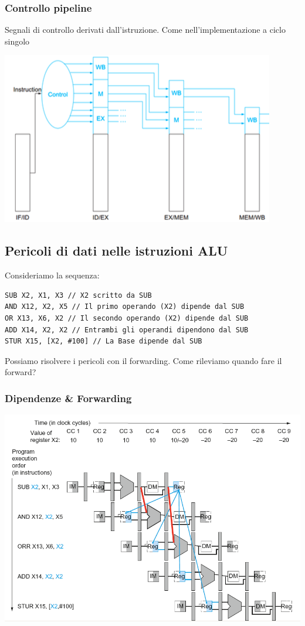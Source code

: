\documentclass[12pt,a4paper]{article}
\begin{document}
\subsubsection{Controllo pipeline}
Segnali di controllo derivati dall'istruzione. Come nell'implementazione a ciclo singolo
\begin{center}
\includegraphics[width=0.6\columnwidth]{img/pipeline_control_1.png}
\end{center}

\subsection{Pericoli di dati nelle istruzioni ALU}
Consideriamo la sequenza:
\begin{verbatim}
SUB X2, X1, X3 // X2 scritto da SUB
AND X12, X2, X5 // Il primo operando (X2) dipende dal SUB
OR X13, X6, X2 // Il secondo operando (X2) dipende dal SUB 
ADD X14, X2, X2 // Entrambi gli operandi dipendono dal SUB
STUR X15, [X2, #100] // La Base dipende dal SUB
\end{verbatim}
Possiamo risolvere i pericoli con il forwarding. Come rileviamo quando fare il forward?
\subsubsection{Dipendenze \& Forwarding}
\begin{center}
\includegraphics[width=0.6\columnwidth]{img/pipeline_forwarding.png}
\end{center}
\end{document}
